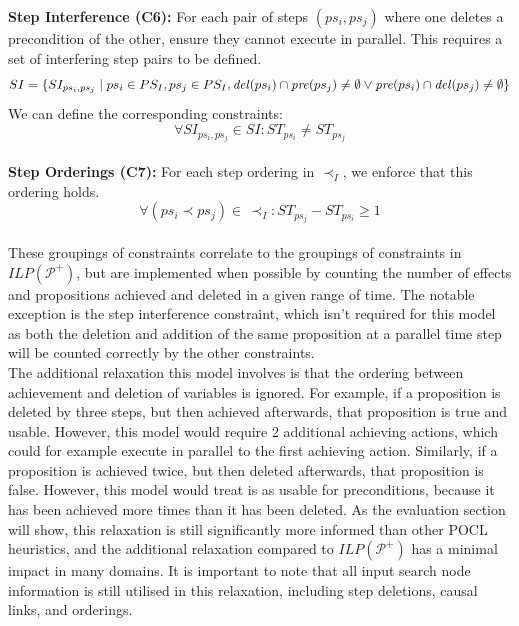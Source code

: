 \textbf{Step Interference (C6):} For each pair of steps $(ps_i,ps_j)$ where one deletes a precondition of the other, ensure they cannot execute in parallel. This requires a set of interfering step pairs to be defined.
\[SI=\{SI_{ps_i,ps_j}\mid ps_i\in PS_I, ps_j\in PS_I, \mathit{del} (ps_i)\cap \mathit{pre} (ps_j)\neq \emptyset \vee \mathit{pre} (ps_i)\cap \mathit{del} (ps_j)\neq \emptyset\}\]
We can define the corresponding constraints:
\[ \forall SI_{ps_i,ps_j}\in SI:ST_{ps_i}\neq ST_{ps_j}\]\\


\textbf{Step Orderings (C7):} For each step ordering in $\prec _I$, we enforce that this ordering holds.
\[ \forall( ps_i\prec ps_j)\in\,\prec_I: ST_{ps_j}-ST_{ps_i}\geq 1\]\\


These groupings of constraints correlate to the groupings of constraints in $\mathit{ILP}(\mathcal{P}^+)$, but are implemented when possible by counting the number of effects and propositions achieved and deleted in a given range of time. The notable exception is the step interference constraint, which isn't required for this model as both the deletion and addition of the same proposition at a parallel time step will be counted correctly by the other constraints.\\


The additional relaxation this model involves is that the ordering between achievement and deletion of variables is ignored. For example, if a proposition is deleted by three steps, but then achieved afterwards, that proposition is true and usable. However, this model would require 2 additional achieving actions, which could for example execute in parallel to the first achieving action. Similarly, if a proposition is achieved twice, but then deleted afterwards, that proposition is false. However, this model would treat is as usable for preconditions, because it has been achieved more times than it has been deleted. As the evaluation section will show, this relaxation is still significantly more informed than other POCL heuristics, and the additional relaxation compared to $\mathit{ILP}(\mathcal{P}^+)$ has a minimal impact in many domains. It is important to note that all input search node information is still utilised in this relaxation, including step deletions, causal links, and orderings.